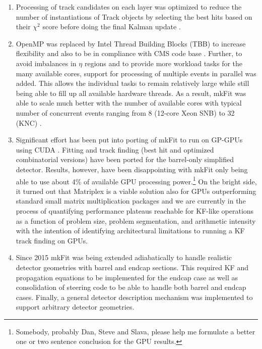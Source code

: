 \documentclass{webofc}
\def\mkfit{mkFit\xspace}
\begin{document}
\begin{enumerate}\topsep-2pt\itemsep-2pt

\item Processing of track candidates on each layer was optimized to
  reduce the number of instantiations of Track objects by selecting the best
  hits based on their $\chi^2$ score before doing the final Kalman update
  \cite{pkf-clone-engine}.

\item OpenMP was replaced by Intel Thread Building Blocks (TBB) to increase
  flexibility and also to be in compliance with CMS code base
  \cite{pkf-tbb}. Further, to avoid imbalances in $\eta$ regions and to provide
  more workload tasks for the many available cores, support for processing of
  multiple events in parallel was added. This allows the individual tasks
  to remain relatively large while still being able to fill up all available
  hardware threads. As a result, \mkfit was able to scale much better with
  the number of available cores with typical number of concurrent events ranging
  from 8 (12-core Xeon SNB) to 32 (KNC) \cite{pkf-acat-17}.

\item Significant effort has been put into porting of \mkfit to run on GP-GPUs
  using CUDA \cite{pkf-gpu}. Fitting and track finding (best hit and optimized
  combinatorial versions) have been ported for the barrel-only simplified
  detector. Results, however, have been disappointing with \mkfit only being
  able to use about 4\% of available GPU processing power.\footnote{Somebody,
    probably Dan, Steve and Slava, please help me formulate a better one or two
    sentence conclusion for the GPU results.} On the bright side, it turned
  out that Matriplex is a viable solution also for GPUs outperforming standard
  small matrix multiplication packages and we are currently in the process of
  quantifying performance plateaus reachable for KF-like operations as a
  function of problem size, problem segmentation, and arithmetic intensity
  with the intention of identifying architectural limitations to running a KF
  track finding on GPUs.

\item Since 2015 \mkfit was being extended adiabatically to handle realistic
  detector geometries with barrel and endcap sections. This required KF and
  propagation equations to be implemented for the endcap case as well as
  consolidation of steering code to be able to handle both barrel and endcap
  cases. Finally, a general detector description mechanism was implemented to
  support arbitrary detector geometries.


\end{enumerate}
\end{document}
